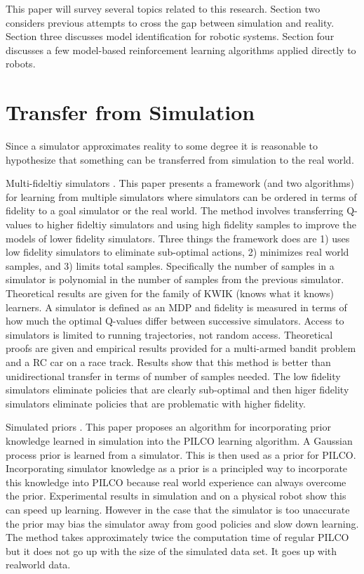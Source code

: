 \documentclass[12 pt]{article}
\begin{document}
This paper will survey several topics related to this research. Section two considers previous attempts to cross the gap between simulation and reality. Section three discusses model identification for robotic systems. Section four discusses a few model-based reinforcement learning algorithms applied directly to robots. 

\section{Transfer from Simulation}

Since a simulator approximates reality to some degree it is reasonable to hypothesize that something can be transferred from simulation to the real world.

Multi-fideltiy simulators \cite{cutler2014reinforcement}.
This paper presents a framework (and two algorithms) for learning from multiple simulators where simulators can be ordered in terms of fidelity to a goal simulator or the real world. The method involves transferring Q-values to higher fideltiy simulators and using high fidelity samples to improve the models of lower fidelity simulators. Three things the framework does are 1) uses low fidelity simulators to eliminate sub-optimal actions, 2) minimizes real world samples, and 3) limits total samples. Specifically the number of samples in a simulator is polynomial in the number of samples from the previous simulator. Theoretical results are given for the family of KWIK (knows what it knows) learners. A simulator is defined as an MDP and fidelity is measured in terms of how much the optimal Q-values differ between successive simulators. Access to simulators is limited to running trajectories, not random access. Theoretical proofs are given and empirical results provided for a multi-armed bandit problem and a RC car on a race track. Results show that this method is better than unidirectional transfer in terms of number of samples needed. The low fidelity simulators eliminate policies that are clearly sub-optimal and then higer fidelity simulators eliminate policies that are problematic with higher fidelity.


Simulated priors \cite{cutler2015efficient}.
This paper proposes an algorithm for incorporating prior knowledge learned in simulation into the PILCO learning algorithm. A Gaussian process prior is learned from a simulator. This is then used as a prior for PILCO. Incorporating simulator knowledge as a prior is a principled way to incorporate this knowledge into PILCO because real world experience can always overcome the prior. Experimental results in simulation and on a physical robot show this can speed up learning. However in the case that the simulator is too unaccurate the prior may bias the simulator away from good policies and slow down learning. The method takes approximately twice the computation time of regular PILCO but it does not go up with the size of the simulated data set. It goes up with realworld data.
\end{document}
